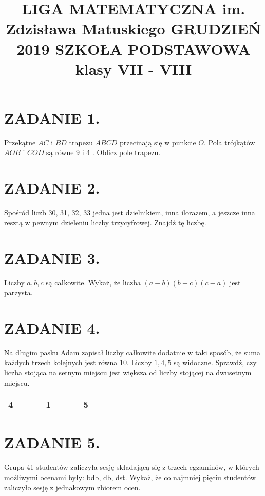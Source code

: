 \documentclass[10pt]{article}
\title{LIGA MATEMATYCZNA im. Zdzisława Matuskiego GRUDZIEŃ 2019 SZKOŁA PODSTAWOWA klasy VII - VIII }
\author{}
\date{}
\begin{document}
\maketitle
\section*{ZADANIE 1.}
Przekątne \(A C\) i \(B D\) trapezu \(A B C D\) przecinają się w punkcie \(O\). Pola trójkątów \(A O B\) i \(C O D\) są równe 9 i 4 . Oblicz pole trapezu.

\section*{ZADANIE 2.}
Spośród liczb 30, 31, 32, 33 jedna jest dzielnikiem, inna ilorazem, a jeszcze inna resztą w pewnym dzieleniu liczby trzycyfrowej. Znajdź tę liczbę.

\section*{ZADANIE 3.}
Liczby \(a, b, c\) są całkowite. Wykaż, że liczba \((a-b)(b-c)(c-a)\) jest parzysta.

\section*{ZADANIE 4.}
Na długim pasku Adam zapisał liczby całkowite dodatnie w taki sposób, że suma każdych trzech kolejnych jest równa 10. Liczby \(1,4,5\) są widoczne. Sprawdź, czy liczba stojąca na setnym miejscu jest większa od liczby stojącej na dwusetnym miejscu.

\begin{center}
\begin{tabular}{|l|l|l|l|l|l|l|l|l|l|l|l}
\hline
4 &  &  &  & 1 &  &  &  & 5 &  &  &  \\
\hline
\end{tabular}
\end{center}

\section*{ZADANIE 5.}
Grupa 41 studentów zaliczyła sesję składającą się z trzech egzaminów, w których możliwymi ocenami były: bdb, db, dst. Wykaż, że co najmniej pięciu studentów zaliczyło sesję z jednakowym zbiorem ocen.
\end{document}

